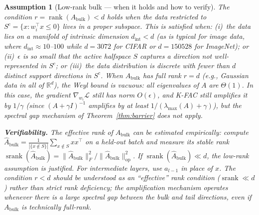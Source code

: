 \documentclass{article}
\providecommand{\R}{\mathbb{R}}
\providecommand{\norm}[1]{\lVert #1 \rVert}
\DeclareMathOperator{\rank}{rank}
\DeclareMathOperator{\srank}{srank}
\theoremstyle{plain}
\newtheorem{assumption}{Assumption}
\theoremstyle{definition}
\theoremstyle{remark}
\begin{document}
\begin{assumption}[Low-rank bulk --- when it holds and how to verify]
\label{ass:low_rank_bulk}
The condition $r = \rank(A_{\mathrm{bulk}}) < d$ holds when the data restricted to $S^c = \{x : w_i^\top x \leq 0\}$ lives in a proper subspace. This is satisfied when: (i)~the data lies on a manifold of intrinsic dimension $d_{\mathrm{int}} < d$ (as is typical for image data, where $d_{\mathrm{int}} \approx 10$--$100$ while $d = 3072$ for CIFAR or $d = 150528$ for ImageNet); or (ii)~$\epsilon$ is so small that the active halfspace $S$ captures a direction not well-represented in $S^c$; or (iii)~the data distribution is discrete with fewer than $d$ distinct support directions in $S^c$. When $A_{\mathrm{bulk}}$ has full rank $r = d$ (e.g., Gaussian data in all of $\R^d$), the Weyl bound is vacuous: all eigenvalues of $A$ are $\Theta(1)$. In this case, the gradient $\nabla_{w_i}\mathcal{L}$ still has norm $O(\epsilon)$, and K-FAC still amplifies it by $1/\gamma$ (since $(A+\gamma I)^{-1}$ amplifies by at least $1/(\lambda_{\max}(A) + \gamma)$), but the \emph{spectral gap} mechanism of Theorem~\ref{thm:barrier} does not apply.

\textbf{Verifiability.} The effective rank of $A_{\mathrm{bulk}}$ can be estimated empirically: compute $\hat{A}_{\mathrm{bulk}} = \frac{1}{|\{x \notin S\}|}\sum_{x \notin S}xx^\top$ on a held-out batch and measure its stable rank $\srank(\hat{A}_{\mathrm{bulk}}) = \norm{\hat{A}_{\mathrm{bulk}}}_F^2/\norm{\hat{A}_{\mathrm{bulk}}}_{\mathrm{op}}^2$. If $\srank(\hat{A}_{\mathrm{bulk}}) \ll d$, the low-rank assumption is justified. For intermediate layers, use $a_{l-1}$ in place of $x$. The condition $r < d$ should be understood as an ``effective'' rank condition ($\srank \ll d$) rather than strict rank deficiency; the amplification mechanism operates whenever there is a large spectral gap between the bulk and tail directions, even if $A_{\mathrm{bulk}}$ is technically full-rank.
\end{assumption}
\end{document}

